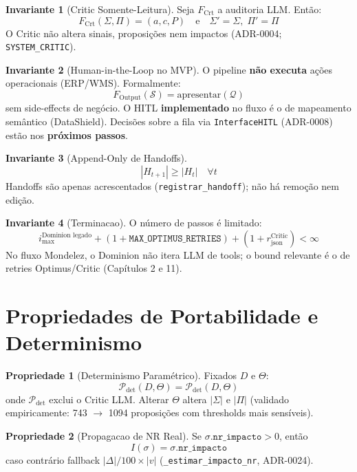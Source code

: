 \documentclass[a4paper, 12pt]{report}
\theoremstyle{definition}
\newtheorem{invariante}{Invariante}[chapter]
\newtheorem{propriedade}{Propriedade}[chapter]
\theoremstyle{remark}
\newcommand{\state}{\mathcal{S}}
\newcommand{\fila}{\mathcal{Q}}
\begin{document}
\begin{invariante}[Critic Somente-Leitura]
  Seja $F_{\text{Crt}}$ a auditoria LLM. Ent\~ao:
  \[
    F_{\text{Crt}}(\Sigma, \Pi) = (a, c, P)
    \quad\text{e}\quad
    \Sigma' = \Sigma,\; \Pi' = \Pi
  \]
  O Critic n\~ao altera sinais, proposi\c{c}\~oes nem impactos
  (ADR-0004; \texttt{SYSTEM\_CRITIC}).
\end{invariante}

\begin{invariante}[Human-in-the-Loop no MVP]
  O pipeline \textbf{n\~ao executa} a\c{c}\~oes operacionais (ERP/WMS).
  Formalmente:
  \[
    F_{\text{Output}}(\state) = \text{apresentar}(\fila)
  \]
  sem side-effects de neg\'ocio. O HITL \textbf{implementado} no
  fluxo \'e o de mapeamento sem\^antico (DataShield). Decis\~oes
  sobre a fila via \texttt{InterfaceHITL} (ADR-0008) est\~ao nos
  \textbf{pr\'oximos passos}.
\end{invariante}

\begin{invariante}[Append-Only de Handoffs]
  \[
    |H_{t+1}| \geq |H_t| \quad \forall t
  \]
  Handoffs s\~ao apenas acrescentados
  (\texttt{registrar\_handoff}); n\~ao h\'a remo\c{c}\~ao nem edi\c{c}\~ao.
\end{invariante}

\begin{invariante}[{Terminacao}]
  O n\'umero de passos \'e limitado:
  \[
    i_{\max}^{\text{Dominion legado}} +
    (1 + \texttt{MAX\_OPTIMUS\_RETRIES}) +
    (1 + r_{\text{json}}^{\text{Critic}})
    < \infty
  \]
  No fluxo Mondelez, o Dominion n\~ao itera LLM de tools; o bound
  relevante \'e o de retries Optimus/Critic (Cap\'itulos 2 e 11).
\end{invariante}


\section{Propriedades de Portabilidade e Determinismo}

\begin{propriedade}[Determinismo Param\'etrico]
  Fixados $D$ e $\Theta$:
  \[
    \mathcal{P}_{\text{det}}(D, \Theta) = \mathcal{P}_{\text{det}}(D, \Theta)
  \]
  onde $\mathcal{P}_{\text{det}}$ exclui o Critic LLM.
  Alterar $\Theta$ altera $|\Sigma|$ e $|\Pi|$ (validado empiricamente:
  743 $\to$ 1094 proposi\c{c}\~oes com thresholds mais sens\'iveis).
\end{propriedade}

\begin{propriedade}[Propagacao de NR Real]
  Se $\sigma.\texttt{nr\_impacto} > 0$, ent\~ao
  \[
    I(\sigma) = \sigma.\texttt{nr\_impacto}
  \]
  caso contr\'ario fallback $|\Delta|/100 \times |v|$
  (\texttt{\_estimar\_impacto\_nr}, ADR-0024).
\end{propriedade}
\end{document}
